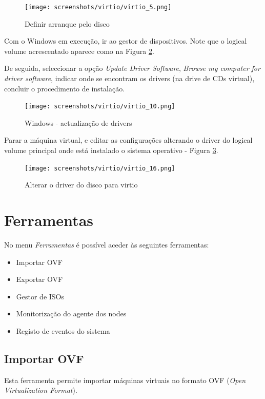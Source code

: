 \begin{figure}[H]
	\begin{center}
	\texttt{[image: screenshots/virtio/virtio\_5.png]}
	\caption{Definir arranque pelo disco}
	\label{fig:virtio5}
	\end{center}
\end{figure}

Com o Windows em execução, ir ao gestor de dispositivos. Note que o logical volume acrescentado aparece como na Figura \ref{fig:virtio10}. 

De seguida, seleccionar a opção \textit{Update Driver Software}, \textit{Browse my computer for driver software}, indicar onde se encontram os drivers (na drive de CDs virtual), concluir o procedimento de instalação.

\begin{figure}[H]
	\begin{center}
	\texttt{[image: screenshots/virtio/virtio\_10.png]}
	\caption{Windows - actualização de drivers}
	\label{fig:virtio10}
	\end{center}
\end{figure}

Parar a máquina virtual, e editar as configurações alterando o driver do logical volume principal onde está instalado o sistema operativo - Figura \ref{fig:virtio16}.

\begin{figure}[H]
	\begin{center}
	\texttt{[image: screenshots/virtio/virtio\_16.png]}
	\caption{Alterar o driver do disco para virtio}
	\label{fig:virtio16}
	\end{center}
\end{figure}

\section{Ferramentas}

No menu \emph{Ferramentas} é possível aceder às seguintes ferramentas:
\begin{itemize}
\item Importar OVF
\item Exportar OVF
\item Gestor de ISOs
\item Monitorização do agente dos nodes
\item Registo de eventos do sistema
\end{itemize}

\subsection{Importar OVF}
Esta ferramenta permite importar máquinas virtuais no formato OVF (\emph{Open Virtualization Format}).

